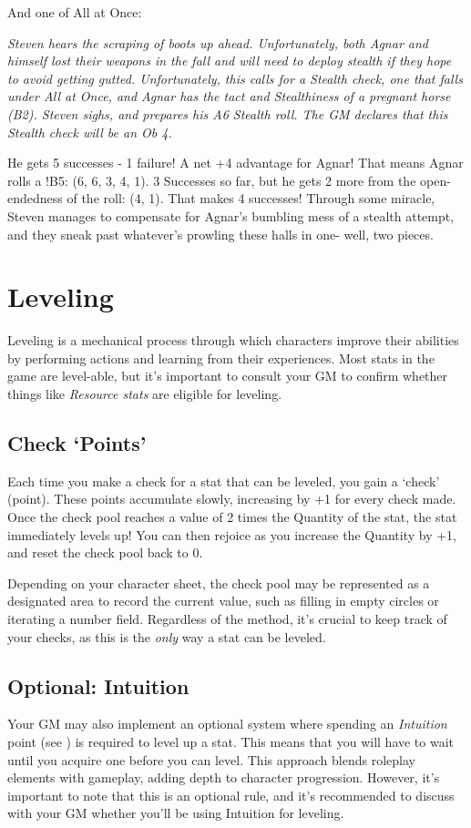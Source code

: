 \documentclass[../main.tex]{subfiles}
\begin{document}
        And one of All at Once:
        \begin{mdframed}[style=Arrata]
            {\em Steven hears the scraping of boots up ahead. Unfortunately, both Agnar and himself lost their weapons in the fall and will need to deploy stealth if they hope to avoid getting gutted. Unfortunately, this calls for a Stealth check, one that falls under All at Once, and Agnar has the tact and Stealthiness of a pregnant horse (B2). Steven sighs, and prepares his A6 Stealth roll. The GM declares that this Stealth check will be an Ob 4.
        
            He gets 5 successes - 1 failure! A net +4 advantage for Agnar! That means Agnar rolls a !B5: (6, 6, 3, 4, 1). 3 Successes so far, but he gets 2 more from the open-endedness of the roll: (4, 1). That makes 4 successes! Through some miracle, Steven manages to compensate for Agnar's bumbling mess of a stealth attempt, and they sneak past whatever's prowling these halls in one- well, two pieces.}
        \end{mdframed}

    \section{Leveling}

    Leveling is a mechanical process through which characters improve their abilities by performing actions and learning from their experiences. Most stats in the game are level-able, but it's important to consult your GM to confirm whether things like \emph{Resource stats} are eligible for leveling.

    \subsection{Check `Points'}

    Each time you make a check for a stat that can be leveled, you gain a `check' (point). These points accumulate slowly, increasing by +1 for every check made. Once the check pool reaches a value of 2 times the Quantity of the stat, the stat immediately levels up! You can then rejoice as you increase the Quantity by +1, and reset the check pool back to 0.

    Depending on your character sheet, the check pool may be represented as a designated area to record the current value, such as filling in empty circles or iterating a number field. Regardless of the method, it's crucial to keep track of your checks, as this is the \emph{only} way a stat can be leveled.

    \subsection{Optional: Intuition}
    
    Your GM may also implement an optional system where spending an \emph{Intuition} point (see {}) is required to level up a stat. This means that you will have to wait until you acquire one before you can level. This approach blends roleplay elements with gameplay, adding depth to character progression. However, it's important to note that this is an optional rule, and it's recommended to discuss with your GM whether you'll be using Intuition for leveling.
\end{document}

